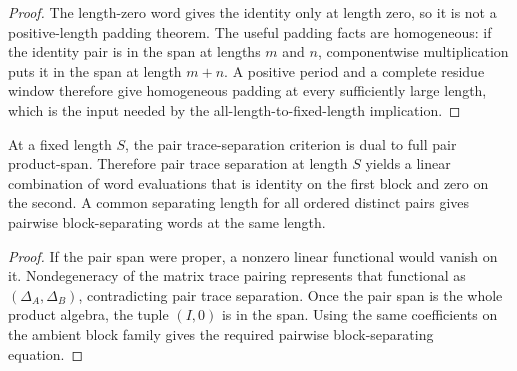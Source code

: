 \begin{proof}
    \leanok
    The length-zero word gives the identity only at length zero, so it is not a
    positive-length padding theorem. The useful padding facts are homogeneous:
    if the identity pair is in the span at lengths $m$ and $n$, componentwise
    multiplication puts it in the span at length $m+n$. A positive period and a
    complete residue window therefore give homogeneous padding at every
    sufficiently large length, which is the input needed by the
    all-length-to-fixed-length implication.
\end{proof}

\begin{lemma}
    \label{lem:pair_trace_separation_to_pairwise_block_separation}
    \leanok
    At a fixed length $S$, the pair trace-separation criterion is dual to full
    pair product-span. Therefore pair trace separation at length $S$ yields a
    linear combination of word evaluations that is identity on the first block
    and zero on the second. A common separating length for all ordered distinct pairs
    gives pairwise block-separating words at the same length.
\end{lemma}

\begin{proof}
    \leanok
    If the pair span were proper, a nonzero linear functional would vanish on
    it. Nondegeneracy of the matrix trace pairing represents that functional
    as $(\Delta_A,\Delta_B)$, contradicting pair trace separation. Once the
    pair span is the whole product algebra, the tuple $(I,0)$ is in the span.
    Using the same coefficients on the ambient block family gives the required
    pairwise block-separating equation.
\end{proof}

